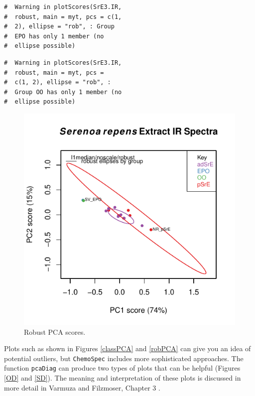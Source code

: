 \documentclass[letter,10pt,twocolumn,twoside,printwatermark=false]{pinp}
\begin{document}
\begin{ShadedResult}
\begin{verbatim}
#  Warning in plotScores(SrE3.IR,
#  robust, main = myt, pcs = c(1,
#  2), ellipse = "rob", : Group
#  EPO has only 1 member (no
#  ellipse possible)
\end{verbatim}
\end{ShadedResult}
\begin{ShadedResult}
\begin{verbatim}
#  Warning in plotScores(SrE3.IR,
#  robust, main = myt, pcs =
#  c(1, 2), ellipse = "rob", :
#  Group OO has only 1 member (no
#  ellipse possible)
\end{verbatim}
\end{ShadedResult}
\begin{figure}

{\centering \includegraphics{ChemoSpec2_files/figure-latex/Chunk21-1} 

}

\caption{\label{robPCA}Robust PCA scores.}\label{fig:Chunk21}
\end{figure}

Plots such as shown in Figures \ref{classPCA} and \ref{robPCA} can give
you an idea of potential outliers, but \texttt{ChemoSpec} includes more
sophisticated approaches. The function \texttt{pcaDiag} can produce two
types of plots that can be helpful (Figures \ref{OD} and \ref{SD}). The
meaning and interpretation of these plots is discussed in more detail in
Varmuza and Filzmoser, Chapter 3 \citep{Filz}.
\end{document}
